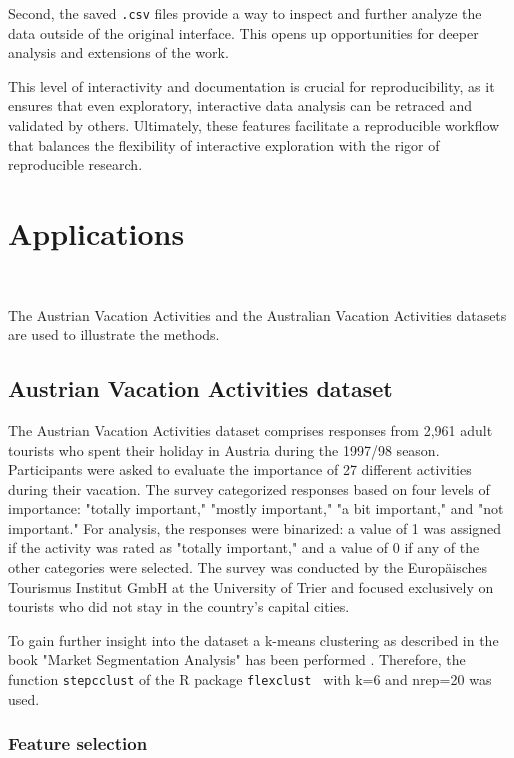 \documentclass[article]{ajs}
\begin{document}
Second, the saved \texttt{.csv} files provide a way to inspect and further analyze the data outside of the original interface. This opens up opportunities for deeper analysis and extensions of the work.

This level of interactivity and documentation is crucial for reproducibility, as it ensures that even exploratory, interactive data analysis can be retraced and validated by others. Ultimately, these features facilitate a reproducible workflow that balances the flexibility of interactive exploration with the rigor of reproducible research.


\section{Applications}~\label{applications}

The Austrian Vacation Activities \cite{dolnicar2003winter} and the Australian Vacation Activities \cite{cliff2009formative} datasets are used to illustrate the methods.

\subsection{Austrian Vacation Activities dataset}

The Austrian Vacation Activities dataset comprises responses from 2,961 adult tourists who spent their holiday in Austria during the 1997/98 season. Participants were asked to evaluate the importance of 27 different activities during their vacation. The survey categorized responses based on four levels of importance: "totally important," "mostly important," "a bit important," and "not important." For analysis, the responses were binarized: a value of 1 was assigned if the activity was rated as "totally important," and a value of 0 if any of the other categories were selected. The survey was conducted by the Europäisches Tourismus Institut GmbH at the University of Trier and focused exclusively on tourists who did not stay in the country's capital cities.

To gain further insight into the dataset a k-means clustering as described in the book "Market Segmentation Analysis" has been performed \citep{leisch2018market}. Therefore, the function \texttt{stepcclust} of the R package \texttt{flexclust
}\citep{flexclust} with k=6 and nrep=20 was used.

\subsubsection{Feature selection}
\end{document}
